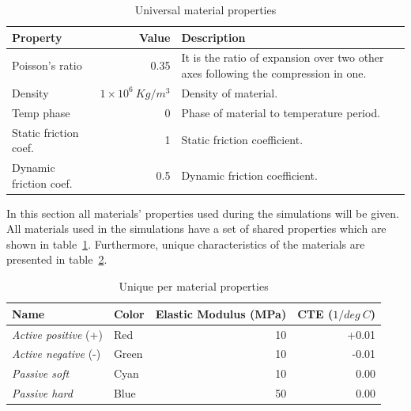 \begin{table}[ht!]
\centering
\caption{Universal material properties}
\label{UniversalMaterialProperties}
    \begin{tabular}{l r p{7cm}}
    \toprule
    \textbf{Property} & \textbf{Value} & \textbf{Description}\\
    \midrule
    Poisson's ratio & 0.35 &  It is the ratio of expansion over two other axes following the compression in one.\\
    Density & $1\times10^{6}\   Kg/m^3$ & Density of material.\\
    Temp phase & 0 & Phase of material to temperature period.\\
    Static friction coef. & 1 & Static friction coefficient.\\
    Dynamic friction coef. & 0.5 & Dynamic friction coefficient.\\
    \bottomrule
    \end{tabular}
\end{table}

In this section all materials' properties used during the simulations will be given. All materials used in the simulations have a set of shared properties which are shown in table~\ref{UniversalMaterialProperties}. Furthermore, unique characteristics of the materials are presented in table~\ref{UniqueMaterialProperties}.

\begin{table}[ht!]
\centering
\caption{Unique per material properties}
\label{UniqueMaterialProperties}
    \begin{tabular}{llrr}
    \toprule
    \textbf{Name}                & \textbf{Color} & \textbf{Elastic Modulus} (MPa) & \textbf{CTE} ($1/deg\ C$) \\
    \midrule
    \emph{Active positive} (+) & Red   & 10                    & +0.01\\
    \emph{Active negative} (-) & Green & 10                   & -0.01 \\
    \emph{Passive soft}       & Cyan  & 10                   & 0.00 \\
    \emph{Passive hard}        & Blue  & 50                   & 0.00\\
    \bottomrule
    \end{tabular}
\end{table}















